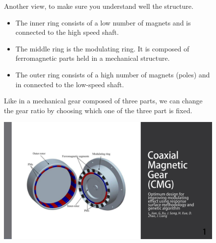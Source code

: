 \begin{figure}[H]
    \begin{minipage}{.45\linewidth}
        
       Another view, to make sure you understand well the structure. 
       \begin{itemize}
           \item The inner ring consists of a low number of magnets and is connected to the high speed shaft. 
           \item The middle ring is the modulating ring. It is composed of ferromagnetic parts held in a mechanical structure.
           \item The outer ring consists of a high number of magnets (poles) and in connected to the low-speed shaft. 
       \end{itemize}
       
       Like in a mechanical gear composed of three parts, we can change the gear ratio by choosing which one of the three part is fixed.


    \end{minipage}
    \hfill%
    \begin{minipage}[c]{.45\linewidth}
        \centering
        \includegraphics[page={10},width=\textwidth]{LELEC2311.allow.pdf}
    
    \end{minipage}
\end{figure}

